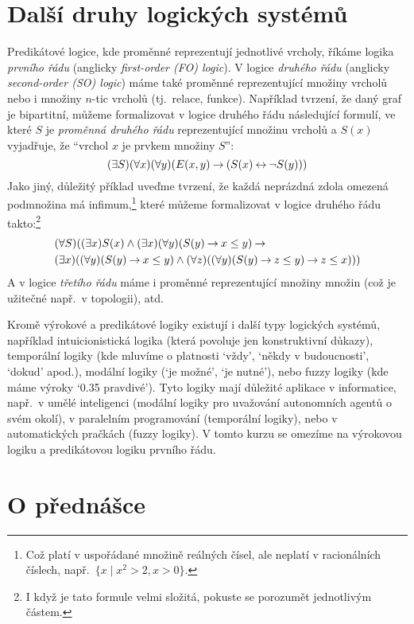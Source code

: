 \section{Další druhy logických systémů}

Predikátové logice, kde proměnné reprezentují jednotlivé vrcholy, říkáme logika \emph{prvního řádu} (anglicky  \emph{first-order (FO) logic}). V logice \emph{druhého řádu} (anglicky \emph{second-order (SO) logic}) máme také proměnné reprezentující množiny vrcholů nebo i množiny \(n\)-tic vrcholů (tj.\ relace, funkce). Například tvrzení, že daný graf je bipartitní, můžeme formalizovat v logice druhého řádu následující formulí, ve které $S$ je \emph{proměnná druhého řádu} reprezentující množinu vrcholů a $S(x)$ vyjadřuje, že ``vrchol $x$ je prvkem množiny $S$'':
$$
(\exists S)(\forall x)(\forall y)(E(x,y)\mathbin{\rightarrow} (S(x)\mathbin{\leftrightarrow}\neg S(y)))
$$
Jako jiný, důležitý příklad uveďme tvrzení, že každá neprázdná zdola omezená podmnožina má infimum,\footnote{Což platí v uspořádané množině reálných čísel, ale neplatí v racionálních číslech, např.\ \( \{x \mid x^2 > 2, x > 0\} \).} které můžeme formalizovat v logice druhého řádu takto:\footnote{I když je tato formule velmi složitá, pokuste se porozumět jednotlivým částem.}
\begin{align*}
&(\forall S)((\exists x)S(x) \land (\exists x)(\forall y)(S(y) \mathbin{\rightarrow} x\leq y) \mathbin{\rightarrow}  {}\\ 
&(\exists x)((\forall y)(S(y) \mathbin{\rightarrow} x\leq y) \land (\forall z)((\forall y)(S(y) \mathbin{\rightarrow} z\leq y)\mathbin{\rightarrow} z\leq x)))
\end{align*}
A v logice \emph{třetího řádu} máme i proměnné reprezentující množiny množin (což je užitečné např.\ v topologii), atd.

Kromě výrokové a predikátové logiky existují i další typy logických systémů, například intuicionistická logika (která povoluje jen konstruktivní důkazy), temporální logiky (kde mluvíme o platnosti `vždy', `někdy v budoucnosti', `dokud' apod.), modální logiky (`je možné', `je nutné'), nebo fuzzy logiky (kde máme výroky `0.35 pravdivé'). Tyto logiky mají důležité aplikace v informatice, např.\ v umělé inteligenci (modální logiky pro uvažování autonomních agentů o svém okolí), v paralelním programování (temporální logiky), nebo v automatických pračkách (fuzzy logiky). %
V tomto kurzu se omezíme na výrokovou logiku a predikátovou logiku prvního řádu.


\section{O přednášce}

